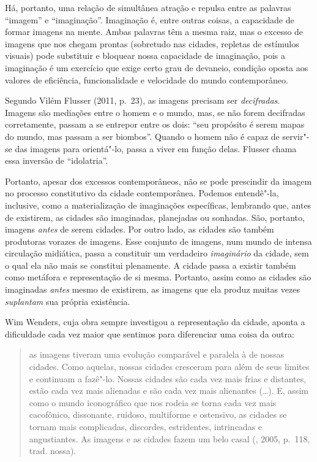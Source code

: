 Há, portanto, uma relação de simultânea atração e repulsa entre as
palavras ``imagem'' e ``imaginação''. Imaginação é, entre outras coisas,
a capacidade de formar imagens na mente. Ambas palavras têm a mesma
raiz, mas o excesso de imagens que nos chegam prontas (sobretudo nas
cidades, repletas de estímulos visuais) pode substituir e bloquear nossa
capacidade de imaginação, pois a imaginação é um exercício que exige
certo grau de devaneio, condição oposta aos valores de eficiência,
funcionalidade e velocidade do mundo contemporâneo.

Segundo Vilém Flusser (2011, p.~23), as imagens precisam ser
\emph{decifradas}. Imagens são mediações entre o homem e o mundo, mas,
se não forem decifradas corretamente, passam a se entrepor entre os
dois: ``seu propósito é serem mapas do mundo, mas passam a ser
biombos''. Quando o homem não é capaz de servir"-se das imagens para
orientá"-lo, passa a viver em função delas. Flusser chama essa inversão
de ``idolatria''.

Portanto, apesar dos excessos contemporâneos, não se pode prescindir da
imagem no processo constitutivo da cidade contemporânea. Podemos
entendê"-la, inclusive, como a materialização de imaginações específicas,
lembrando que, antes de existirem, as cidades são imaginadas, planejadas
ou sonhadas. São, portanto, imagens \emph{antes} de serem cidades. Por
outro lado, as cidades são também produtoras vorazes de imagens. Esse
conjunto de imagens, num mundo de intensa circulação midiática, passa a
constituir um verdadeiro \emph{imaginário} da cidade, sem o qual ela não
mais se constitui plenamente. A cidade passa a existir também como
metáfora e representação de si mesma. Portanto, assim como as cidades
são imaginadas \emph{antes} mesmo de existirem, as imagens que ela
produz muitas vezes \emph{suplantam} sua própria existência.

Wim Wenders, cuja obra sempre investigou a representação da cidade,
aponta a dificuldade cada vez maior que sentimos para diferenciar uma
coisa da outra:

\begin{quote}
as imagens tiveram uma evolução comparável e paralela à de nossas
cidades. Como aquelas, nossas cidades cresceram para além de seus
limites e continuam a fazê"-lo. Nossas cidades são cada vez mais frias e
distantes, estão cada vez mais alienadas e são cada vez mais alienantes
(\ldots{}). E, assim como o mundo iconográfico que nos rodeia se torna cada
vez mais cacofônico, dissonante, ruidoso, multiforme e ostensivo, as
cidades se tornam mais complicadas, discordes, estridentes, intrincadas
e angustiantes. As imagens e as cidades fazem um belo casal (,
2005, p.~118, trad. nossa).
\end{quote}

